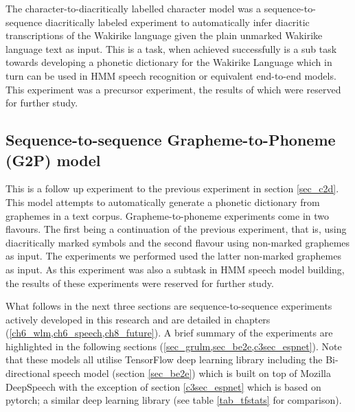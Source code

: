 The character-to-diacritically labelled character model was a sequence-to-sequence diacritically labeled experiment to automatically infer diacritic transcriptions of the Wakirike language given the plain unmarked Wakirike language text as input.  This is a task, when achieved successfully is a sub task towards developing a phonetic dictionary for the Wakirike Language which in turn can be used in HMM speech recognition or equivalent  end-to-end models.  This experiment was a precursor experiment, the results of which were reserved for further study.
\subsection{Sequence-to-sequence Grapheme-to-Phoneme (G2P) model}
This is a follow up experiment to the previous experiment in section \ref{sec_c2d}. This model attempts to automatically generate a phonetic dictionary from graphemes in a text corpus. Grapheme-to-phoneme experiments come in two flavours. The first being a continuation of the previous experiment, that is, using diacritically marked symbols and the second flavour using non-marked graphemes as input.  The experiments we performed used the latter non-marked graphemes as input. As this experiment was also a subtask in HMM speech model building,  the results of these experiments were reserved for further study.

What follows in the next three sections are sequence-to-sequence experiments actively developed in this research and are detailed in chapters (\ref{ch6_wlm,ch6_speech,ch8_future}).  A brief summary of the experiments are highlighted in the following sections (\ref{sec_grulm,sec_be2e,c3sec_espnet}).  Note that these models all utilise TensorFlow deep learning library including the Bi-directional speech model (section \ref{sec_be2e}) which is built on top of Mozilla DeepSpeech with the exception of section \ref{c3sec_espnet} which is based on pytorch; a similar deep learning library (see table \ref{tab_tfstats} for comparison).

